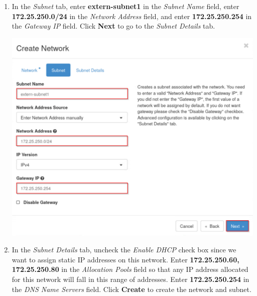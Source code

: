 \documentclass[letterpaper, 12pt]{article}
\begin{document}
\begin{enumerate}
    \item In the \textit{Subnet} tab, enter \textbf{extern-subnet1} in the \textit{Subnet Name} field, enter \textbf{172.25.250.0/24} in the \textit{Network Address} field, and enter \textbf{172.25.250.254} in the \textit{Gateway IP} field.
    Click \textbf{Next} to go to the \textit{Subnet Details} tab.

    \begin{center}
        \includegraphics[width=\linewidth]{images/part1/step8.png}
    \end{center}

    \item In the \textit{Subnet Details} tab, uncheck the \textit{Enable DHCP} check box since we want to assign static IP addresses on this network.
    Enter \textbf{172.25.250.60, 172.25.250.80} in the \textit{Allocation Pools} field so that any IP address allocated for this network will fall in this range of addresses.
    Enter \textbf{172.25.250.254} in the \textit{DNS Name Servers} field.
    Click \textbf{Create} to create the network and subnet.


\end{enumerate}
\end{document}
